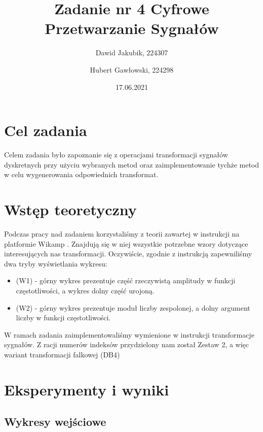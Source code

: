 \documentclass[12pt]{article}
\title{{\bf Zadanie nr 4 }\linebreak
Cyfrowe Przetwarzanie Sygnałów}
\author{Dawid Jakubik, 224307 \and Hubert Gawłowski, 224298}
\date{17.06.2021}
\begin{document}
\clearpage\maketitle
\thispagestyle{empty}
\newpage
\setcounter{page}{1}
\section{Cel zadania}

Celem zadania było zapoznanie się z operacjami transformacji sygnałów dyskretnych przy użyciu wybranych metod oraz zaimplementowanie tychże metod w celu wygenerowania odpowiednich transformat.

\section{Wstęp teoretyczny}
Podczas pracy nad zadaniem korzystaliśmy z teorii zawartej w instrukcji na platformie Wikamp \cite{instrukcja}. Znajdują się w niej wszystkie potrzebne wzory dotyczące interesujących nas transformacji.
Oczywiście, zgodnie z instrukcją zapewniliśmy dwa tryby wyświetlania wykresu:
\begin{itemize}
    \item (W1) - górny wykres prezentuje część rzeczywistą amplitudy w funkcji częstotliwości, a wykres dolny część urojoną.
    \item (W2) - górny wykres prezentuje moduł liczby zespolonej, a dolny argument liczby w funkcji częstotliwości.
\end{itemize}
W ramach zadania zaimplementowaliśmy wymienione w instrukcji transformacje sygnałów. Z racji numerów indeksów przydzielony nam został Zestaw 2, a więc wariant transformacji falkowej (DB4)


\section{Eksperymenty i wyniki}


\subsection{Wykresy wejściowe}
\end{document}
